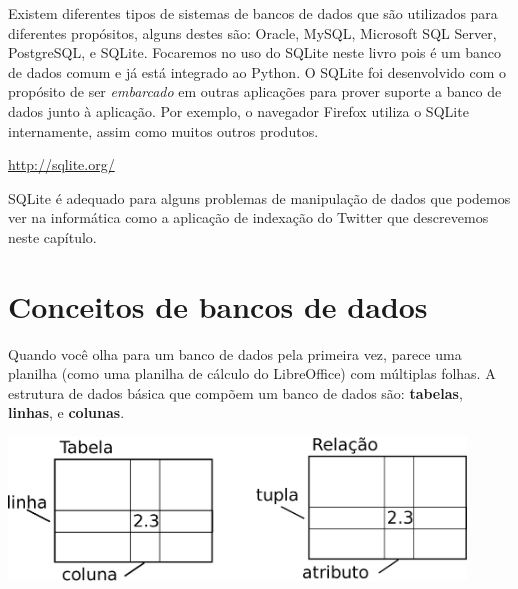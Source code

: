 
Existem diferentes tipos de sistemas de bancos de dados que são utilizados 
para diferentes propósitos, alguns destes são: Oracle, MySQL, Microsoft SQL
Server, PostgreSQL, e SQLite. Focaremos no uso do SQLite neste livro pois é
um banco de dados comum e já está integrado ao Python. O SQLite foi
desenvolvido com o propósito de ser \emph{embarcado} em outras aplicações para
prover suporte a banco de dados junto à aplicação. Por exemplo, o navegador
Firefox utiliza o SQLite internamente, assim como muitos outros produtos.

\url{http://sqlite.org/}


SQLite é adequado para alguns problemas de manipulação de dados que podemos
ver na informática como a aplicação de indexação do Twitter que descrevemos
neste capítulo.

\section{Conceitos de bancos de dados}


Quando você olha para um banco de dados pela primeira vez, parece uma planilha
(como uma planilha de cálculo do LibreOffice) com múltiplas folhas. A
estrutura de dados básica que compõem um banco de dados são:
{\bf tabelas}, {\bf linhas}, e {\bf colunas}.

\beforefig
\centerline{\includegraphics[height=1.50in]{figs2/relational.eps}}
\afterfig

